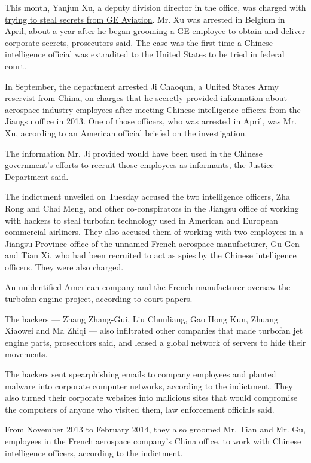 This month, Yanjun Xu, a deputy division director in the office, was
charged with
\href{https://www.nytimes.com/2018/10/10/us/politics/china-spy-espionage-arrest.html}{trying
to steal secrets from GE Aviation}. Mr. Xu was arrested in Belgium in
April, about a year after he began grooming a GE employee to obtain and
deliver corporate secrets, prosecutors said. The case was the first time
a Chinese intelligence official was extradited to the United States to
be tried in federal court.

In September, the department arrested Ji Chaoqun, a United States Army
reservist from China, on charges that he
\href{https://www.nytimes.com/2018/09/25/us/politics/ji-chaoqun-china-spy.html}{secretly
provided information about aerospace industry employees} after meeting
Chinese intelligence officers from the Jiangsu office in 2013. One of
those officers, who was arrested in April, was Mr. Xu, according to an
American official briefed on the investigation.

The information Mr. Ji provided would have been used in the Chinese
government's efforts to recruit those employees as informants, the
Justice Department said.

The indictment unveiled on Tuesday accused the two intelligence
officers, Zha Rong and Chai Meng, and other co-conspirators in the
Jiangsu office of working with hackers to steal turbofan technology used
in American and European commercial airliners. They also accused them of
working with two employees in a Jiangsu Province office of the unnamed
French aerospace manufacturer, Gu Gen and Tian Xi, who had been
recruited to act as spies by the Chinese intelligence officers. They
were also charged.

An unidentified American company and the French manufacturer oversaw the
turbofan engine project, according to court papers.

The hackers --- Zhang Zhang-Gui, Liu Chunliang, Gao Hong Kun, Zhuang
Xiaowei and Ma Zhiqi --- also infiltrated other companies that made
turbofan jet engine parts, prosecutors said, and leased a global network
of servers to hide their movements.

The hackers sent spearphishing emails to company employees and planted
malware into corporate computer networks, according to the indictment.
They also turned their corporate websites into malicious sites that
would compromise the computers of anyone who visited them, law
enforcement officials said.

From November 2013 to February 2014, they also groomed Mr. Tian and Mr.
Gu, employees in the French aerospace company's China office, to work
with Chinese intelligence officers, according to the indictment.

